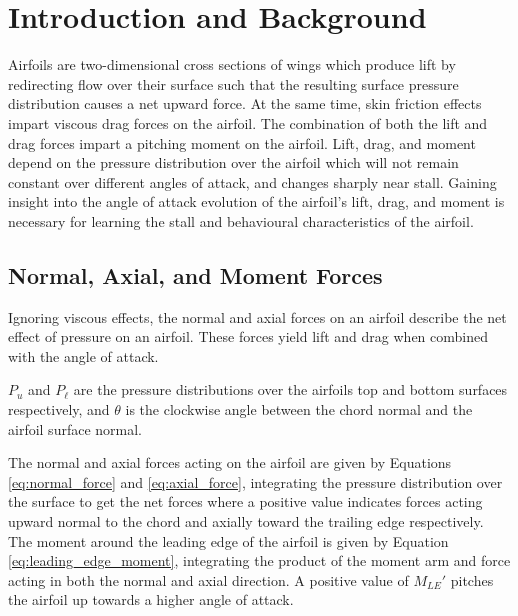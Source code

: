 \documentclass[runningheads]{llncs}
\begin{document}


\section{Introduction and Background}\label{sec:introduction_and_background}

Airfoils are two-dimensional cross sections of wings which produce lift by redirecting flow over their surface such that the resulting surface pressure distribution causes a net upward force. At the same time, skin friction effects impart viscous drag forces on the airfoil. The combination of both the lift and drag forces impart a pitching moment on the airfoil. Lift, drag, and moment depend on the pressure distribution over the airfoil which will not remain constant over different angles of attack, and changes sharply near stall. Gaining insight into the angle of attack evolution of the airfoil's lift, drag, and moment is necessary for learning the stall and behavioural characteristics of the airfoil.

\subsection{Normal, Axial, and Moment Forces}

Ignoring viscous effects, the normal and axial forces on an airfoil describe the net effect of pressure on an airfoil. These forces yield lift and drag when combined with the angle of attack.

$P_u$ and $P_\ell$ are the pressure distributions over the airfoils top and bottom surfaces respectively, and $\theta$ is the clockwise angle between the chord normal and the airfoil surface normal.

The normal and axial forces acting on the airfoil are given by Equations \ref{eq:normal_force} and \ref{eq:axial_force}, integrating the pressure distribution over the surface to get the net forces where a positive value indicates forces acting upward normal to the chord and axially toward the trailing edge respectively. The moment around the leading edge of the airfoil is given by Equation \ref{eq:leading_edge_moment}, integrating the product of the moment arm and force acting in both the normal and axial direction. A positive value of $M_{LE}'$ pitches the airfoil up towards a higher angle of attack.
\end{document}
